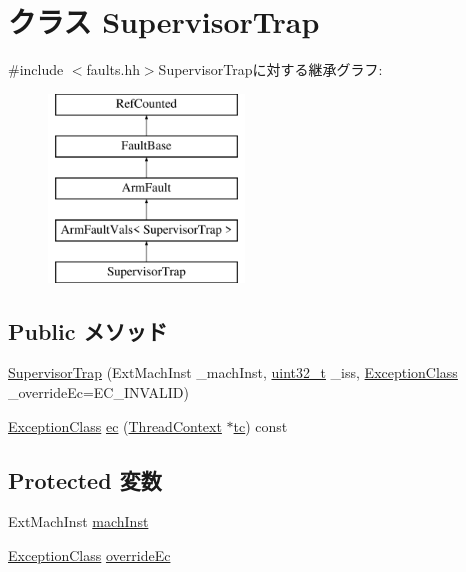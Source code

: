 \hypertarget{classArmISA_1_1SupervisorTrap}{
\section{クラス SupervisorTrap}
\label{classArmISA_1_1SupervisorTrap}
}


{\ttfamily \#include $<$faults.hh$>$}SupervisorTrapに対する継承グラフ:\begin{figure}[H]
\begin{center}
\leavevmode
\includegraphics[height=5cm]{classArmISA_1_1SupervisorTrap}
\end{center}
\end{figure}
\subsection*{Public メソッド}
\begin{DoxyCompactItemize}
\item 
\hyperlink{classArmISA_1_1SupervisorTrap_a4495049d8fb76e06d9669611708775df}{SupervisorTrap} (ExtMachInst \_\-machInst, \hyperlink{Type_8hh_a435d1572bf3f880d55459d9805097f62}{uint32\_\-t} \_\-iss, \hyperlink{namespaceArmISA_a04034d12009cf36227f4d2abff3331a2}{ExceptionClass} \_\-overrideEc=EC\_\-INVALID)
\item 
\hyperlink{namespaceArmISA_a04034d12009cf36227f4d2abff3331a2}{ExceptionClass} \hyperlink{classArmISA_1_1SupervisorTrap_aefab73b22a74d7c48b8a23230906d7cd}{ec} (\hyperlink{classThreadContext}{ThreadContext} $\ast$\hyperlink{namespaceArmISA_a5aff829af55e65b802d83dfcef4e9dd0}{tc}) const 
\end{DoxyCompactItemize}
\subsection*{Protected 変数}
\begin{DoxyCompactItemize}
\item 
ExtMachInst \hyperlink{classArmISA_1_1SupervisorTrap_a4a11fa8755d51be93a88861302a9378d}{machInst}
\item 
\hyperlink{namespaceArmISA_a04034d12009cf36227f4d2abff3331a2}{ExceptionClass} \hyperlink{classArmISA_1_1SupervisorTrap_af5e67d95019a0b5aba4c42205567eda7}{overrideEc}
\end{DoxyCompactItemize}


